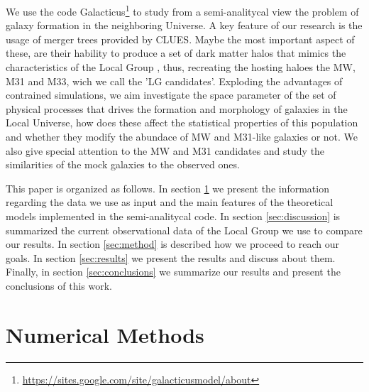 \documentclass[usenatbib]{mn2e}
\begin{document}
We use the code Galacticus\footnote{\url{https://sites.google.com/site/galacticusmodel/about}} to study from a semi-analitycal view the problem of galaxy formation in the neighboring Universe.  A key feature of our research is the usage of merger trees
provided by CLUES. Maybe the most important aspect of these, are their hability to produce a set of dark matter halos that mimics the characteristics of the Local Group , thus, recreating
the hosting haloes the MW, M31 and M33, wich we call the 'LG candidates'. Exploding the advantages of contrained simulations, we aim investigate the space parameter of the set of physical processes that drives the formation and morphology of 
galaxies in the Local Universe, how does these  affect the statistical properties of this population and  whether they modify the abundace of MW and M31-like galaxies or not. We also give special attention
to the MW and M31 candidates and study the similarities of the mock galaxies to the observed ones.
 
This paper is organized as follows. In section \ref{sec:numerical} we present the information regarding the data we use as input and the main features of the theoretical models implemented in the semi-analitycal
code. In section \ref{sec:discussion} is summarized the current observational data of the Local Group we use to compare our results. In section \ref{sec:method} is described how we proceed
to reach our goals. In section \ref{sec:results} we present the results and discuss about them. Finally, in section \ref{sec:conclusions} we summarize our results and present the conclusions
of this work.
 

\section{Numerical Methods}
\label{sec:numerical}
\end{document}
